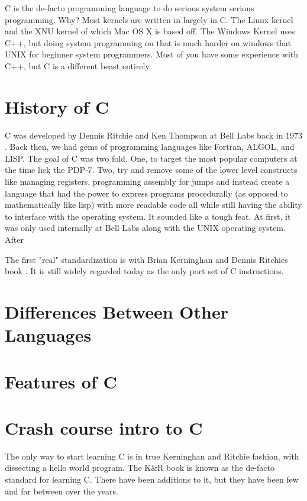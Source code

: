 
C is the de-facto programming language to do serious system serious programming. Why? Most kernels are written in largely in C. The Linux kernel \cite{Love} and the XNU kernel \citet{xnukernel} of which Mac OS X is based off. The Windows Kernel uses C++, but doing system programming on that is much harder on windows that UNIX for beginner system programmers. Most of you have some experience with C++, but C is a different beast entirely.

\section{History of C}

C was developed by Dennis Ritchie and Ken Thompson at Bell Labs back in 1973 \cite{Ritchie:1993:DCL:155360.155580}. Back then, we had gems of programming languages like Fortran, ALGOL, and LISP. The goal of C was two fold. One, to target the most popular computers at the time liek the PDP-7. Two, try and remove some of the lower level constructs like managing registers, programming assembly for jumps and instead create a language that had the power to express programs procedurally (as opposed to mathematically like lisp) with more readable code all while still having the ability to interface with the operating system. It sounded like a tough feat. At first, it was only used internally at Bell Labs along with the UNIX operating system. After

The first "real" standardization is with Brian Kerninghan and Dennis Ritchies book \cite{kernighan1988c}. It is still widely regarded today as the only \gls{port} set of C instructions.

\section{Differences Between Other Languages}

\section{Features of C}

\section{Crash course intro to C}\label{crash-course-intro-to-c}

The only way to start learning C is in true Kerninghan and Ritchie fashion, with dissecting a hello world program. The K\&R book is known as the de-facto standard for learning C. There have been additions to it, but they have been few and far between over the years.

